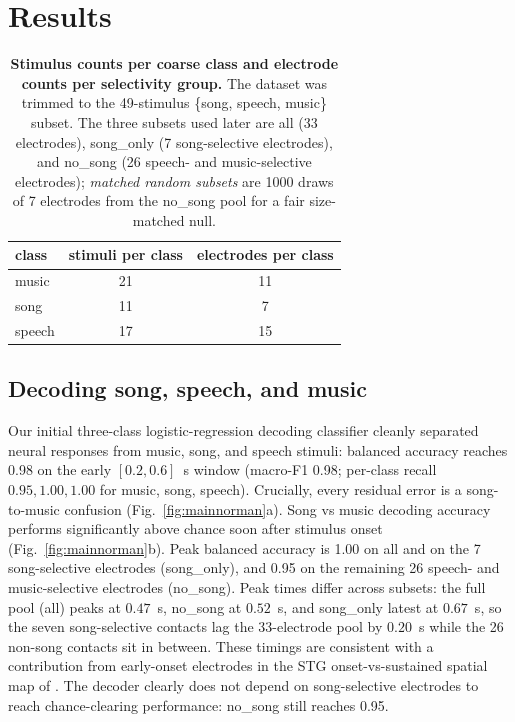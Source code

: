\documentclass[11pt]{article}
\begin{document}
\section{Results}\label{sec:results}

\begin{table}[t]
\centering\small
\caption{\textbf{Stimulus counts per coarse class and electrode counts per selectivity group.} The dataset was trimmed to the 49-stimulus \{song, speech, music\} subset. The three subsets used later are \textsf{all} (33 electrodes), \textsf{song\_only} (7 song-selective electrodes), and \textsf{no\_song} (26 speech- and music-selective electrodes); \emph{matched random subsets} are 1000 draws of 7 electrodes from the \textsf{no\_song} pool for a fair size-matched null.}
\label{tab:divergence}
\begin{tabular}{lcc}
\toprule
class & stimuli per class & electrodes per class \\
\midrule
music  & 21 & 11 \\
song   & 11 & 7 \\
speech & 17 & 15 \\
\bottomrule
\end{tabular}
\end{table}
\subsection{Decoding song, speech, and music}
Our initial three-class logistic-regression decoding classifier cleanly separated neural responses from music, song, and speech stimuli: balanced accuracy reaches 0.98 on the early $[0.2, 0.6]$~s window (macro-F1 0.98; per-class recall $0.95, 1.00, 1.00$ for music, song, speech). Crucially, every residual error is a song-to-music confusion (Fig.~\ref{fig:mainnorman}a). Song vs music decoding accuracy performs significantly above chance soon after stimulus onset (Fig.~\ref{fig:mainnorman}b). Peak balanced accuracy is 1.00 on \textsf{all} and on the 7 song-selective electrodes (\textsf{song\_only}), and 0.95 on the remaining 26 speech- and music-selective electrodes (\textsf{no\_song}). Peak times differ across subsets: the full pool (\textsf{all}) peaks at $0.47$~s, \textsf{no\_song} at $0.52$~s, and \textsf{song\_only} latest at $0.67$~s, so the seven song-selective contacts lag the 33-electrode pool by $0.20$~s while the 26 non-song contacts sit in between. These timings are consistent with a contribution from early-onset electrodes in the STG onset-vs-sustained spatial map of \citet{Hamilton2018}. The decoder clearly does not depend on song-selective electrodes to reach chance-clearing performance: \textsf{no\_song} still reaches 0.95.
\end{document}

